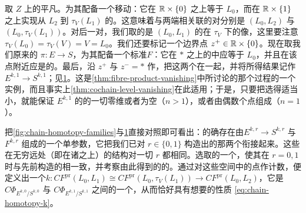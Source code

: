 取 $Z$ 上的平凡\trFibration。为其配备一个移动\trLagrange\trBoundaryCondition：它在 $\mathbb{R}\times\{0\}$ 之上等于 $L_0$，而在 $\mathbb{R}\times\{1\}$ 之上实现从 $L_2$ 到 $\tau_V(L_1)$ 的\trIsotopy。这意味着与两端相关联的\trLagrange\trSubmanifold{}对分别是 $(L_0,L_2)$ 与 $(L_0,\tau_V(L_1))$。对后一对，我们取的\trFloerDatum{}是 $(L_0,L_1)$ 的\trFloerDatum{}在 $\tau_V$ 下的像，这里要注意 $\tau_V(L_0)=\tau_V(V)=V=L_0$。我们还要标记一个边界点 $z^+\in\mathbb{R}\times\{0\}$。现在取我们原来的 $\pi\colon E\to S$，为其配备一个标准\trBoundaryCondition{}$F$：它在 $\ast$ 之上的\trFiber{}中应等于 $L_0$，并且在该点附近应是\trLocallyConstant{}的。最后，沿 $z^+$ 与 $z^-=\ast$ 作\trBoundaryConnectedSum，把这两个\trFibration{}\trGluing{}在一起，并将所得结果记作 $E^{k,1}\to S^{k,1}$；见\cref{fig:boundary-sum-k1}。这是\cref{thm:fibre-product-vanishing}中所讨论的那个过程的一个实例，而且事实上\cref{thm:cochain-level-vanishing}在此适用；于是，只要把\trGluingParameter{}选得适当小，就能保证 $E^{k,1}$ 的\trPseudoholomorphic\trSection{}的一切零维\trModuliSpace{}或者为空（$n>1$），或者由偶数个点组成（$n=1$）。
\begin{figure}[htbp]
\centering
{}
\caption{}\label{fig:boundary-sum-k1}
\end{figure}
把\cref{fig:chain-homotopy-families}与\cref{fig:boundary-sum-k1}直接对照即可看出：的确存在由\trFibration{}$E^{k,r}\to S^{k,r}$ 与\trBoundaryCondition{}$F^{k,r}$ 组成的一个单参数\trFamily，它把我们已对 $r\in\{0,1\}$ 构造出的那两个衔接起来。这些\trFibration{}在无穷远处（即在诸\trStriplikeEnd{}之上）的结构对一切 $r$ 都相同。选取\trRelative\trPerturbationDatum{}的一个\trFamily，使其在 $r=0,1$ 时与先前构造的相一致，并考察由此得到的\trParametrization{}的\trPseudoholomorphic\trSection{}\trModuliSpace。通过对这些空间中的\trIsolated{}点作计数，便定义出一个\trHomomorphism{}$k\colon CF^{\mathrm{pr}}(L_0,L_1)\cong CF^{\mathrm{pr}}(L_0,\tau_V(L_1))\to CF^{\mathrm{pr}}(L_0,L_2)$，它是 $C\Phi_{E^{k,0}/S^{k,0}}$ 与 $C\Phi_{E^{k,1}/S^{k,1}}$ 之间的一个\trChainHomotopy，从而恰好具有想要的性质 \eqref{eq:chain-homotopy-k}。
